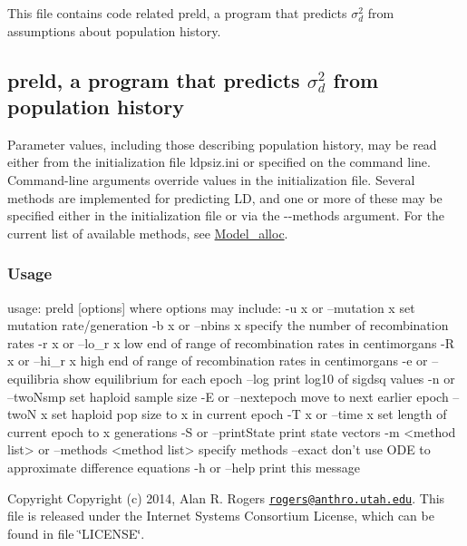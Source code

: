 This file contains code related preld, a program that predicts $\sigma_d^2$ from assumptions about population history.

\label{preld_preld}%
\hypertarget{preld_preld}{}%
\subsection*{{\ttfamily preld}, a program that predicts $\sigma_d^2$ from population history }

Parameter values, including those describing population history, may be read either from the initialization file {\ttfamily ldpsiz.\+ini} or specified on the command line. Command-\/line arguments override values in the initialization file. Several methods are implemented for predicting L\+D, and one or more of these may be specified either in the initialization file or via the {\ttfamily -\/-\/methods} argument. For the current list of available methods, see \hyperlink{model_8h_a1c02862e00fd2fd232c5ba777beadc84}{Model\+\_\+alloc}.

\subsubsection*{Usage }

\begin{DoxyVerb}usage: preld [options]
   where options may include:
   -u \<x\> or --mutation \<x\>
      set mutation rate/generation
   -b \<x\> or --nbins \<x\>
      specify the number of recombination rates
   -r \<x\> or --lo_r \<x\>
      low end of range of recombination rates in centimorgans
   -R \<x\> or --hi_r \<x\>
      high end of range of recombination rates in centimorgans
   -e or --equilibria
      show equilibrium for each epoch
   --log
      print log10 of sigdsq values
   -n or --twoNsmp
      set haploid sample size
   -E or --nextepoch
      move to next earlier epoch
   --twoN \<x\>
      set haploid pop size to x in current epoch
   -T \<x\> or --time \<x\>
      set length of current epoch to x generations
   -S or --printState
      print state vectors
   -m <method list> or --methods <method list>
      specify methods
   --exact
      don't use ODE to approximate difference equations
   -h or --help
      print this message
\end{DoxyVerb}


\begin{DoxyCopyright}{Copyright}
Copyright (c) 2014, Alan R. Rogers \href{mailto:rogers@anthro.utah.edu}{\tt rogers@anthro.\+utah.\+edu}. This file is released under the Internet Systems Consortium License, which can be found in file \char`\"{}\+L\+I\+C\+E\+N\+S\+E\char`\"{}. 
\end{DoxyCopyright}

